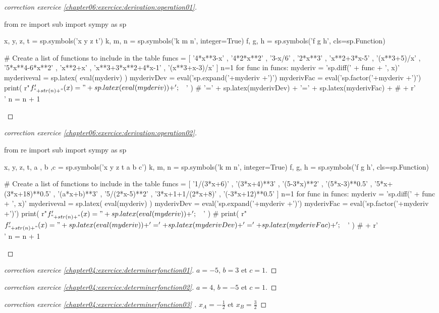 \documentclass[main.tex]{subfiles}
\begin{document}
 
\begin{proof}[correction exercice \ref{chapter06:exercice:derivation:operation01}] %
\noindent
\begin{pycode}
from re import sub
import sympy as sp

x, y, z, t = sp.symbols('x y z t')
k, m, n = sp.symbols('k m n', integer=True)
f, g, h = sp.symbols('f g h', cls=sp.Function)

# Create a list of functions to include in the table
funcs = [
'4*x**3-x'
, '4*2*x**2' 
, '3-x/6' 
, '2*x**3'
, 'x**2+3*x-5'
, '(x**3+5)/x'
, '5*x**4-6*x**2'
, 'x**2+x'
, 'x**3+3*x**2+4*x-1'
, '(x**3+x-3)/x'
]
n=1 
for func in funcs: 
	myderiv = 'sp.diff(' + func + ', x)' 
	myderiveval = sp.latex( eval(myderiv) )
	myderivDev =  eval('sp.expand('+myderiv +')')
	myderivFac =  eval('sp.factor('+myderiv +')')
	print(   r"$f'_{"+ str(n)+"}(x)=" + sp.latex( eval(myderiv) ) + '; \quad$' ) 
	# '=' + sp.latex(myderivDev)  + '=' + sp.latex(myderivFac) + 
	# + r'\\' 
	n     = n + 1 
\end{pycode}
\end{proof} 
\begin{proof}[correction exercice \ref{chapter06:exercice:derivation:operation02}] %
\noindent
\begin{pycode}
from re import sub
import sympy as sp

x, y, z, t, a , b ,c = sp.symbols('x y z t a b c')
k, m, n = sp.symbols('k m n', integer=True)
f, g, h = sp.symbols('f g h', cls=sp.Function)

# Create a list of functions to include in the table
funcs = [
'1/(3*x+6)'
, '(3*x+4)**3' 
, '(5-3*x)**2' 
, '(5*x-3)**0.5'
, '5*x+(3*x+18)**0.5'
, '(a*x+b)**3'
, '5/(2*x-5)**2'
, '3*x+1+1/(2*x+8)'
, '(-3*x+12)**0.5' 
]
n=1 
for func in funcs: 
	myderiv = 'sp.diff(' + func + ', x)' 
	myderiveval = sp.latex( eval(myderiv) )
	myderivDev =  eval('sp.expand('+myderiv +')')
	myderivFac =  eval('sp.factor('+myderiv +')')
	print(   r"$f'_{"+ str(n)+"}(x)=" + sp.latex( eval(myderiv) ) + '; \quad$' ) 
	#	print(   r"$f'_{"+ str(n)+"}(x)=" + sp.latex( eval(myderiv) ) + '=' + sp.latex(myderivDev)  + '=' + sp.latex(myderivFac) + '; \quad$' ) 
	# + r'\\' 
	n     = n + 1 
\end{pycode}
\end{proof}
\begin{proof}[correction exercice \ref{chapter04:exercice:determinerfonction01}]
	$a=-5$, $b=3$ et $c=1$.
\end{proof}
\begin{proof}[correction exercice \ref{chapter04:exercice:determinerfonction02}]
	$a=4$, $b=-5$ et $c=1$.
\end{proof}
\begin{proof}[correction exercice \ref{chapter04:exercice:determinerfonction03} ]
	$x_A=-\frac{1}{2}$ et $x_B=\frac{3}{2}$
\end{proof}
\end{document}
